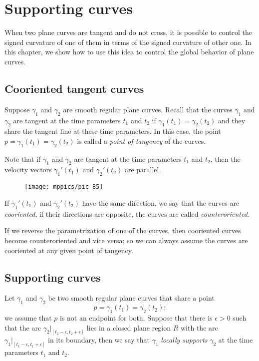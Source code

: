 \chapter{Supporting curves}
\label{chap:supporting-curves}

When two plane curves are tangent and do not cross, it is possible to control the signed curvature of one of them in terms of the signed curvature of other one.
In this chapter, we show how to use this idea to control the global behavior of plane curves.

\section{Cooriented tangent curves}

Suppose $\gamma_1$ and $\gamma_2$ are smooth regular plane curves.
Recall that the curves $\gamma_1$ and $\gamma_2$ are tangent at the  time parameters $t_1$ and $t_2$
if $\gamma_1(t_1)=\gamma_2(t_2)$
and they share the tangent line at these time parameters.
In this case, the point $p=\gamma_1(t_1)=\gamma_2(t_2)$ is called a \emph{point of tangency} of the curves.

Note that if $\gamma_1$ and $\gamma_2$ are tangent at the time parameters $t_1$ and $t_2$, 
then the velocity vectors $\gamma_1'(t_1)$ and $\gamma_2'(t_2)$ are parallel.
\begin{figure}[!ht]
\vskip-0mm
\centering
\texttt{[image: mppics/pic-85]}
\vskip0mm
\end{figure}
If $\gamma_1'(t_1)$ and $\gamma_2'(t_2)$ have the same direction, we say that the curves are \emph{cooriented},
if their directions are opposite, the curves are called \emph{counteroriented}.

If we reverse the parametrization of one of the curves, then cooriented curves become counteroriented and vice versa; so we can always assume the curves are cooriented at any given point of tangency.

\section{Supporting curves}

Let $\gamma_1$ and $\gamma_2$ be two smooth regular plane curves that share a point 
\[p=\gamma_1(t_1)=\gamma_2(t_2);\] 
we assume that $p$ is not an endpoint for both.
Suppose that there is $\epsilon>0$ such that the arc $\gamma_2|_{[t_2-\epsilon, t_2+\epsilon]}$ lies in a closed plane region $R$ with the arc $\gamma_1|_{[t_1-\epsilon, t_1+\epsilon]}$ in its boundary,
then we say that $\gamma_1$ \emph{locally supports} $\gamma_2$ at the time parameters $t_1$ and $t_2$.

